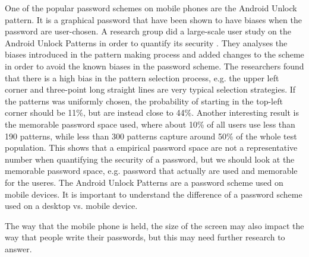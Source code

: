   One of the popular password schemes on mobile phones are the Android Unlock pattern. It is a graphical password that have been shown to have biases when the password are user-chosen. A research group did a large-scale user study on the Android Unlock Patterns in order to quantify its security \cite{Uellenbeck}. They analyses the biases introduced in the pattern making process and added changes to the scheme in order to avoid the known biases in the password scheme. The researchers found that there is a high bias in the pattern selection process, e.g. the upper left corner and three-point long straight lines are very typical selection strategies. If the patterns was uniformly chosen, the probability of starting in the top-left corner should be 11\%, but are instead close to 44\%. Another interesting result is the memorable password space used, where about 10\% of all users use less than 190 patterns, while less than 300 patterns capture around 50\% of the whole test population. This shows that a empirical password space are not a representative number when quantifying the security of a password, but we should look at the memorable password space, e.g. password that actually are used and memorable for the useres. The Android Unlock Patterns are a password scheme used on mobile devices. It is important to understand the difference of a password scheme used on a desktop vs. mobile device.

  The way that the mobile phone is held, the size of the screen may also impact the way that people write their passwords, but this may need further research to answer.

  